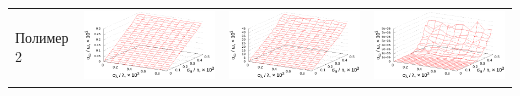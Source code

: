 \documentclass[11pt,a4paper]{article}
\theoremstyle{definition}
\begin{document}
\begin{table}[h]
\begin{tabular}{l | c c c}
	\begin{rotate}{90}Полимер 2\end{rotate} &	\includegraphics[scale=0.4]{figs/even/p2.txt_coeff0.dat.eps} & \includegraphics[scale=0.4]{figs/even/p2.txt_coeff1.dat.eps} & \includegraphics[scale=0.4]{figs/even/p2.txt_coeff2.dat.eps}
  \end{tabular}
  \label{tabl:res_even}
\end{table}
\end{document}
